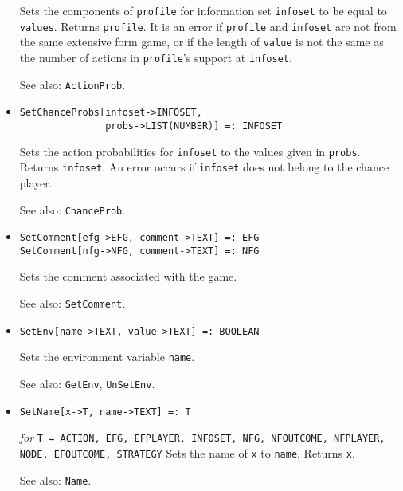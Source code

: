 \begin{itemize}
\bd
Sets the components of \verb+profile+ for
information set \verb+infoset+ to be equal to \verb+values+.
Returns \verb+profile+.  It is an error if \verb+profile+ and \verb+infoset+
are not from the same extensive form game, or if the length of
\verb+value+ is not the same as the number of actions in \verb+profile+'s
support at \verb+infoset+.
\item [See also:] \verb+ActionProb+.
\ed

\item{}
\protect \large \begin{verbatim} 
SetChanceProbs[infoset->INFOSET, 
               probs->LIST(NUMBER)] =: INFOSET 
\end{verbatim}\normalsize

\bd
Sets the action probabilities for 
\verb+infoset+ to the values given in \verb+probs+.  Returns \verb+infoset+. 
An error occurs if \verb+infoset+ does not belong to the chance player.
\item [See also:] \verb+ChanceProb+.
\ed

\item{}
\protect \large \begin{verbatim}
SetComment[efg->EFG, comment->TEXT] =: EFG
SetComment[nfg->NFG, comment->TEXT] =: NFG
\end{verbatim} \normalsize

\bd
Sets the comment associated with the game.
\item [See also:] \verb+SetComment+.
\ed

\item{}
\protect \large \begin{verbatim}
SetEnv[name->TEXT, value->TEXT] =: BOOLEAN 
\end{verbatim} \normalsize

\bd
Sets the environment variable \verb+name+.
\item [See also:] \verb+GetEnv+, \verb+UnSetEnv+.
\ed

\item{}
\protect \large \begin{verbatim}
SetName[x->T, name->TEXT] =: T
\end{verbatim}\normalsize

{\it for} {\tt T = ACTION, EFG, EFPLAYER, INFOSET, NFG, NFOUTCOME, 
NFPLAYER, NODE, EFOUTCOME, STRATEGY}
\bd
Sets the name of \verb+x+ to \verb+name+.  Returns \verb+x+.
\item [See also:] \verb+Name+.
\ed


\end{itemize}
